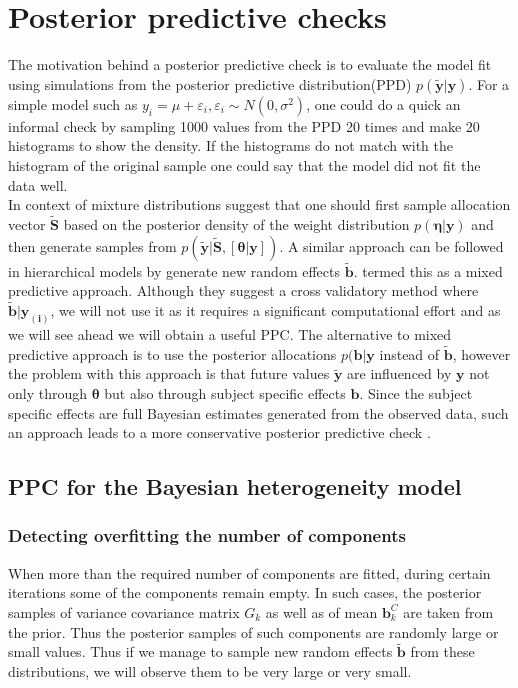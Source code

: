 \section{Posterior predictive checks}
\label{sec : ppc}
The motivation behind a posterior predictive check is to evaluate the model fit using simulations from the posterior predictive distribution(PPD) $p(\boldsymbol{\tilde{y}}|\boldsymbol{y})$. For a simple model such as $y_i = \mu + \varepsilon_i, \varepsilon_i \sim N(0, \sigma^2)$, one could do a quick an informal check by sampling 1000 values from the PPD 20 times and make 20 histograms to show the density. If the histograms do not match with the histogram of the original sample one could say that the model did not fit the data well.\\

In context of mixture distributions \citet{fruhwirth-schnatter_finite_2013} suggest that one should first sample allocation vector $\boldsymbol{\tilde{S}}$ based on the posterior density of the weight distribution $p(\boldsymbol{\eta}|\boldsymbol{y})$ and then generate samples from $p(\boldsymbol{\tilde{y}}|\boldsymbol{\tilde{S}}, [\boldsymbol{\theta}|\boldsymbol{y}])$. A similar approach can be followed in hierarchical models by generate new random effects $\boldsymbol{\tilde{b}}$. \citet{marshall_approximate_2003} termed this as a mixed predictive approach. Although they suggest a cross validatory method where $\boldsymbol{\tilde{b}}|\boldsymbol{y_{(i)}}$, we will not use it as it requires a significant computational effort and as we will see ahead we will obtain a useful PPC. The alternative to mixed predictive approach is to use the posterior allocations $p(\boldsymbol{b}|\boldsymbol{y}$ instead of $\boldsymbol{\tilde{b}}$, however the problem with this approach is that future values $\boldsymbol{\tilde{y}}$ are influenced by $\boldsymbol{y}$ not only through $\boldsymbol{\theta}$ but also through subject specific effects $\boldsymbol{b}$. Since the subject specific effects are full Bayesian estimates generated from the observed data, such an approach leads to a more conservative posterior predictive check \citep{congdon_applied_2010}.\\

\subsection{PPC for the Bayesian heterogeneity model}
\label{subsec : ppc_bhtge}
\subsubsection{Detecting overfitting the number of components}
When more than the required number of components are fitted, during certain iterations some of the components remain empty. In such cases, the posterior samples of variance covariance matrix $G_k$ as well as of mean $\boldsymbol{b}_k^C$ are taken from the prior. Thus the posterior samples of such components are randomly large or small values. Thus if we manage to sample new random effects $\boldsymbol{\tilde{b}}$ from these distributions, we will observe them to be very large or very small.\\

